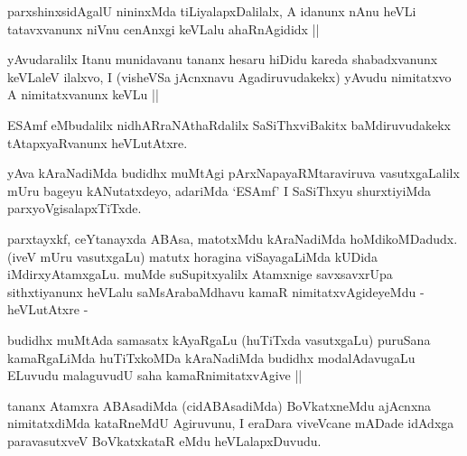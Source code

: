 \begin{artha}
parxshinxsidAgalU nininxMda tiLiyalapxDalilalx, A idanunx nAnu heVLi tatavxvanunx niVnu cenAnxgi keVLalu ahaRnAgididx ||
\end{artha}


\begin{artha}
yAvudaralilx Itanu munidavanu tananx hesaru hiDidu kareda shabadxvanunx keVLaleV ilalxvo, I (visheVSa jAcnxnavu Agadiruvudakekx) yAvudu nimitatxvo A nimitatxvanunx keVLu ||
\end{artha}

\begin{artha}
ESAmf eMbudalilx nidhARraNAthaRdalilx SaSiThxviBakitx baMdiruvudakekx tAtapxyaRvanunx heVLutAtxre.
\end{artha}

\begin{artha}
yAva kAraNadiMda budidhx muMtAgi pArxNapayaRMtaraviruva vasutxgaLalilx mUru bageyu kANutatxdeyo, adariMda `ESAmf' I SaSiThxyu shurxtiyiMda parxyoVgisalapxTiTxde.
\end{artha}

\begin{artha}
parxtayxkf, ceYtanayxda ABAsa, matotxMdu kAraNadiMda hoMdikoMDadudx. (iveV mUru vasutxgaLu) matutx horagina viSayagaLiMda kUDida iMdirxyAtamxgaLu. muMde suSupitxyalilx Atamxnige savxsavxrUpa sithxtiyanunx heVLalu saMsArabaMdhavu kamaR nimitatxvAgideyeMdu - heVLutAtxre -
\end{artha}

\begin{artha}
budidhx muMtAda samasatx kAyaRgaLu (huTiTxda vasutxgaLu) puruSana kamaRgaLiMda huTiTxkoMDa kAraNadiMda budidhx modalAdavugaLu ELuvudu malaguvudU saha kamaRnimitatxvAgive ||
\end{artha}


\begin{artha}
tananx Atamxra ABAsadiMda (cidABAsadiMda) BoVkatxneMdu ajAcnxna nimitatxdiMda kataRneMdU Agiruvunu, I eraDara viveVcane mADade idAdxga paravasutxveV BoVkatxkataR eMdu heVLalapxDuvudu.
\end{artha}


\begin{artha}

\end{artha}

